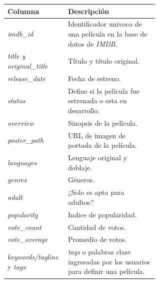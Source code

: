 \documentclass[11pt,a4paper,twoside]{thesis}
\begin{document}
\begin{table}[!htb]
	\centering
	\footnotesize
	\begin{tabular}{l | p{0.6\linewidth}}
		\hline
		Columna                                   & Descripción                                                                           \\
		\hline
		\textit{imdb\_id}                         & Identificador univoco de una película en la base de datos de \textit{IMDB}.           \\
		\textit{title y original\_title}          & Título y título original.                                                             \\
		\textit{release\_date}                    & Fecha de estreno.                                                                     \\
		\textit{status}                           & Define si la película fue estrenada o esta en desarrollo.                             \\
		\textit{overview}                         & Sinopsis de la película.                                                              \\
		\textit{poster\_path}                     & URL de imagen de portada de la película.                                              \\
		\textit{languages}                        & Lenguaje original y doblaje.                                                          \\
		\textit{genres}                           & Géneros.                                                                              \\
		\textit{adult}                            & ¿Solo es apta para adultos?                                                           \\
		\textit{popularity}                       & Indice de popularidad.                                                                \\
		\textit{vote\_count}                      & Cantidad de votos.                                                                    \\
		\textit{vote\_average}                    & Promedio de votos.                                                                    \\
		\textit{keywords/tagline} y \textit{tags} & \textit{tags} o palabras clase ingresadas por los usuarios para definir una película. \\

\end{tabular}
\end{table}
\end{document}
